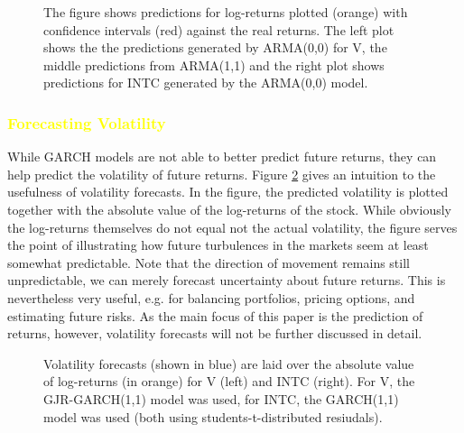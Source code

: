 \begin{figure}[h]
    \centering
    \begin{adjustbox}{width = 0.95\textwidth}
    
    
    
    \end{adjustbox}
    \caption{The figure shows predictions for log-returns plotted (orange) with confidence intervals (red) against the real returns. The left plot shows the the predictions generated by ARMA(0,0) for V, the middle predictions from ARMA(1,1) and the right plot shows predictions for INTC generated by the ARMA(0,0) model.}
    \label{fig:V_INTC_ARMA_predictions_plot}
\end{figure}{}
\subsubsection{\textcolor{yellow}{Forecasting Volatility}}
While GARCH models are not able to better predict future returns, they can help predict the volatility of future returns. Figure \ref{fig:volatility_pred} gives an intuition to the usefulness of volatility forecasts. In the figure, the predicted volatility is plotted together with the absolute value of the log-returns of the stock. While obviously the log-returns themselves do not equal not the actual volatility, the figure serves the point of illustrating how future turbulences in the markets seem at least somewhat predictable. Note that the direction of movement remains still unpredictable, we can merely forecast uncertainty about future returns. This is nevertheless very useful, e.g. for balancing portfolios, pricing options, and estimating future risks. As the main focus of this paper is the prediction of returns, however, volatility forecasts will not be further discussed in detail.

\begin{figure}[h]
    \centering
    \begin{adjustbox}{width = 0.95\textwidth}
    
    
    \end{adjustbox}
    \caption{Volatility forecasts (shown in blue) are laid over the absolute value of log-returns (in orange) for V (left) and INTC (right). For V, the GJR-GARCH(1,1) model was used, for INTC, the GARCH(1,1) model was used (both using students-t-distributed resiudals).}
    \label{fig:volatility_pred}
\end{figure}{}

